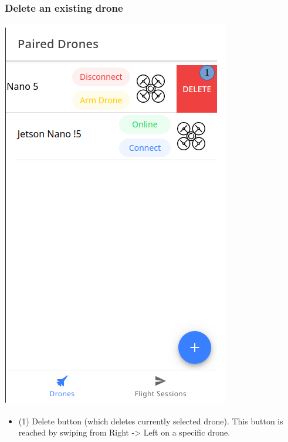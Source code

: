 \subsubsection{Delete an existing drone}
\begin{minipage}[c]{0.5\linewidth}
	\centering
	\includegraphics[scale=0.4]{./assets/images/delete.png}
	\label{fig: mainPageDroneDelete}
\end{minipage}
\begin{minipage}[c]{0.5\linewidth}
	\begin{itemize}
		\item (1) Delete button (which deletes currently selected drone). This button is reached by swiping from Right -> Left on a specific drone.
	\end{itemize}
\end{minipage}

\newpage
